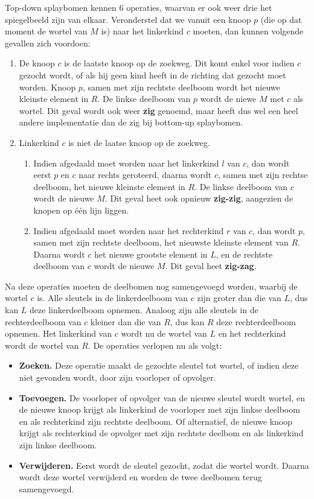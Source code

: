 \documentclass{report}
\begin{document}
\begin{itemize}
		Top-down splaybomen kennen 6 operaties, waarvan er ook weer drie het spiegelbeeld zijn van elkaar. Veronderstel dat we vanuit een knoop $p$ (die op dat moment de wortel van $M$ is) naar het linkerkind $c$ moeten, dan kunnen volgende gevallen zich voordoen:
		\begin{enumerate}
			\item De knoop $c$ is de laatste knoop op de zoekweg. Dit komt enkel voor indien $c$ gezocht wordt, of als hij geen kind heeft in de richting dat gezocht moet worden. Knoop $p$, samen met zijn rechtste deelboom wordt het nieuwe kleinste element in $R$. De linkse deelboom van $p$ wordt de niewe $M$ met $c$ als wortel. Dit geval wordt ook weer \textbf{zig} genoemd, maar heeft dus wel een heel andere implementatie dan de zig bij bottom-up splaybomen.
			\item Linkerkind $c$ is niet de laatse knoop op de zoekweg. 
			\begin{enumerate}
				\item Indien afgedaald moet worden naar het linkerkind $l$ van $c$, dan wordt eerst $p$ en $c$ naar rechts geroteerd, daarna wordt $c$, samen met zijn rechtse deelboom, het nieuwe kleinste element in $R$. De linkse deelboom van $c$ wordt de nieuwe $M$. Dit geval heet ook opnieuw \textbf{zig-zig}, aangezien de knopen op één lijn liggen.
				\item Indien afgedaald moet worden naar het rechterkind $r$ van $c$, dan wordt $p$, samen met zijn rechtste deelboom, het nieuwste kleinste element van $R$. Daarna wordt $c$ het nieuwe grootste element in $L$, en de rechtste deelboom van $c$ wordt de nieuwe $M$. Dit geval heet \textbf{zig-zag}.
			\end{enumerate}
		\end{enumerate}
		Na deze operaties moeten de deelbomen nog samengevoegd worden, waarbij de wortel $c$ is. Alle sleutels in de linkerdeelboom van $c$ zijn groter dan die van $L$, dus kan $L$ deze linkerdeelboom opnemen. Analoog zijn alle sleutels in de rechterdeelboom van $c$ kleiner dan die van $R$, dus kan $R$ deze rechterdeelboom opnemen. Het linkerkind van $c$ wordt nu de wortel van $L$ en het rechterkind wordt de wortel van $R$.
		De operaties verlopen nu als volgt:
			\begin{itemize}
				\item \textbf{Zoeken.} Deze operatie maakt de gezochte sleutel tot wortel, of indien deze niet gevonden wordt, door zijn voorloper of opvolger.
				\item \textbf{Toevoegen.} De voorloper of opvolger van de nieuwe sleutel wordt wortel, en de nieuwe knoop krijgt als linkerkind de voorloper met zijn linkse deelboom en als rechterkind zijn rechtste deelboom. Of alternatief, de nieuwe knoop krijgt als rechterkind de opvolger met zijn rechtste deelbom en als linkerkind zijn linkse deelboom.
				\item \textbf{Verwijderen.} Eerst wordt de sleutel gezocht, zodat die wortel wordt. Daarna wordt deze wortel verwijderd en worden de twee deelbomen terug samengevoegd.
			\end{itemize}
	\end{itemize}
\end{document}
